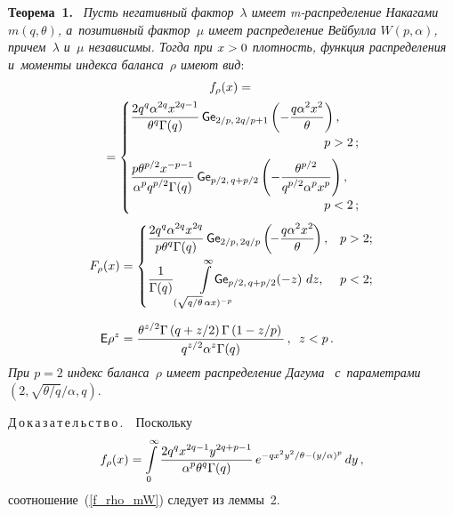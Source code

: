 \begin{multicols}{2}
\noindent
\textbf{Теорема~1.}\
\textit{Пусть негативный фактор~$\lambda$ имеет m-рас\-пре\-де\-ле\-ние 
Накагами $m(q, \theta)$, 
а~позитивный фактор~$\mu$ имеет распределение Вейбулла $W(p,\alpha)$, причем~$\lambda$ 
и~$\mu$ независимы. Тогда при $x\hm>0$ плотность, функция распределения 
и~моменты индекса баланса~$\rho$ имеют вид}:
\begin{multline}
\label{f_rho_mW}
f_\rho(x) ={}\\[1pt]
{}=
 \begin{cases}
   \displaystyle\fr{2 q^q \alpha^{2q} x^{2q-1}}
   {{\theta^q \Gamma(q)}}\,{\sf Ge}_{2/p,\,2q/p+1} 
   \left(-\fr{q\alpha^2 x^2}{\theta}\right), &\\[6pt]
   &\hspace*{-10mm}p > 2\,;\\[6pt]
   \displaystyle \fr{p \theta^{p/2}x^{-p-1}}{{\alpha^p q^{p/2}  \Gamma(q)}}\,
   {\sf Ge}_{p/2,\, q+p/2} \left(-\fr{\theta^{p/2}}{q^{p/2}\alpha^p 
x^p}\right), &\\[6pt]
&\hspace*{-10mm}p < 2\,;
 \end{cases}
\end{multline}
\begin{align*}
F_\rho(x) &=
 \begin{cases}
   \displaystyle \fr{2 q^q\alpha^{2q} x^{2q}}{{p\theta^q \Gamma(q)}}\,
    {\sf Ge}_{2/p,\, 2q/p} \left(\!- \fr{q \alpha^2 x^2}{\theta}\!\right), &p > 2;\\[9pt]
   \displaystyle \fr{1}{{\Gamma(q)}}
   \int\limits_{(\sqrt{q/\theta}\,\alpha x)^{-p}}^{\infty}
   \hspace*{-4mm}\hspace*{-7pt} {\sf Ge}_{p/2,\, q + p/2}(-z) \ dz, 
   &p < 2;
 \end{cases}
\\[6pt]
\e\rho^z& =\fr{\theta^{z/2}\Gamma\left(q+z/2\right)\Gamma\left(1-z/p\right)}
{{{q^{z/2}\alpha^z}\Gamma(q)}}\,, \enskip z<p\,.
\end{align*}
\textit{При $p=2$ индекс баланса~$\rho$ имеет распределение Дагума}~\cite{Dagum1977} 
\textit{с~параметрами} $(2, \sqrt{\theta/q}/\alpha, q)$.

\smallskip

\noindent
Д\,о\,к\,а\,з\,а\,т\,е\,л\,ь\,с\,т\,в\,о\,.\ \ Поскольку
$$
f_\rho(x) = \int\limits_0^{\infty} \displaystyle\frac{\displaystyle 2 q^q x^{2q-1} y^{2q+p-1}\mathstrut}{\displaystyle {\alpha^p 
\theta^q \Gamma(q)}\mathstrut}\,e^{-q x^2 y^2/\theta- (y/\alpha)^p} \, dy\,,
$$
соотношение~(\ref{f_rho_mW}) следует из леммы~2.


\end{multicols}
